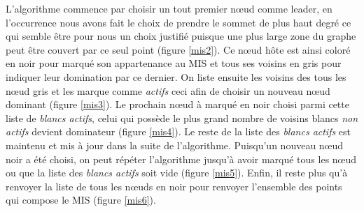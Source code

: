 \newpage
L'algorithme commence par choisir un tout premier nœud comme leader, en l'occurrence nous avons fait le choix de prendre le sommet de plus haut degré ce qui semble être pour nous un choix justifié puisque une plus large zone du graphe peut être couvert par ce seul point (figure \ref{mis2}). Ce nœud hôte est ainsi coloré en noir pour marqué son appartenance au MIS et tous ses voisins en gris pour indiquer leur domination par ce dernier. On liste ensuite les voisins des tous les nœud gris et les marque comme \textit{actifs} ceci afin de choisir un nouveau nœud dominant (figure \ref{mis3}). Le prochain nœud à marqué en noir choisi parmi cette liste de \textit{blancs actifs}, celui qui possède le plus grand nombre de voisins blancs \textit{non actifs} devient dominateur (figure \ref{mis4}). Le reste de la liste des \textit{blancs actifs} est maintenu et mis à jour dans la suite de l'algorithme. Puisqu'un nouveau nœud noir a été choisi, on peut répéter l'algorithme jusqu'à avoir marqué tous les nœud ou que la liste des \textit{blancs actifs} soit vide (figure \ref{mis5}). Enfin, il reste plus qu'à renvoyer la liste de tous les nœuds en noir pour renvoyer l'ensemble des points qui compose le MIS (figure \ref{mis6}).